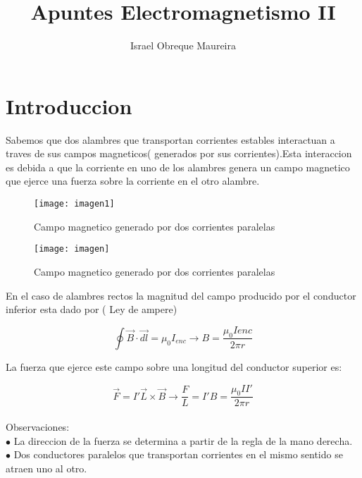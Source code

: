 \documentclass[13pt,twoside]{article}
\title{Apuntes Electromagnetismo II}
\date{}
\author{Israel Obreque Maureira}
\begin{document}
\maketitle

\section{Introduccion}
Sabemos que dos alambres que transportan corrientes estables interactuan a traves de sus campos magneticos( generados por sus corrientes).Esta interaccion es debida a que la corriente en uno de los alambres genera un campo magnetico que ejerce una fuerza sobre la corriente en el otro alambre.\\

\begin{figure}[htb]
 \centering
   \texttt{[image: imagen1]}
  \caption{Campo magnetico generado por dos corrientes paralelas}	
  \label{fig:ejemplo}
\end{figure}



\begin{figure}[htb]
 \centering
   \texttt{[image: imagen]}
  \caption{Campo magnetico generado por dos corrientes paralelas}	
  \label{fig:ejemplo}
\end{figure}



En el caso de alambres rectos la magnitud del campo producido por el conductor inferior esta dado por ( Ley de ampere)


\begin{equation}
\displaystyle\oint \vec{B}\cdot\vec{dl}=\mu_0I_{enc}\rightarrow \displaystyle B=\frac{\mu_0I{enc}}{2 \pi r}
\end {equation}

La fuerza que ejerce este campo sobre una longitud del conductor superior es:

\begin{equation}
\displaystyle\vec{F}=I'\vec{L}\times\vec{B}\rightarrow\displaystyle\frac{F}{L}=I'B=\frac{\mu_0II'}{2\pi r}
\end{equation} \\	

Observaciones:\\

$\bullet$ La direccion de la fuerza se determina a partir de la regla de la mano derecha.\\

$\bullet$ Dos conductores paralelos que transportan corrientes en el mismo sentido se atraen uno al otro.\\
\end{document}
